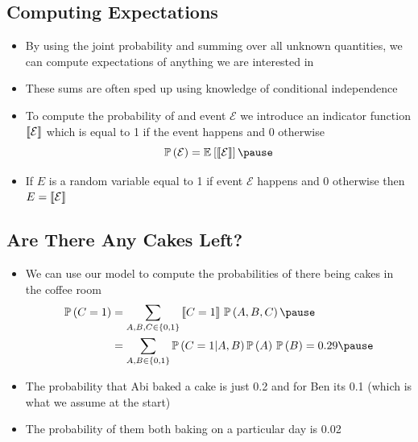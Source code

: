 
\begin{slide}
\section{Computing Expectations}

\begin{PauseHighLight}
  \begin{itemize}
  \item By using the joint probability and summing over all unknown
    quantities, we can compute expectations of anything we are
    interested in\pause
  \item These sums are often sped up using knowledge of conditional
    independence\pause
  \item To compute the probability of and event $\mathcal{E}$ we
    introduce an indicator function $\left\llbracket { \small \mathcal{E}} \right\rrbracket$ which is
    equal to 1 if the event happens and 0 otherwise
    $$ \Prob{\mathcal{E}} = \av{\pred{\mathcal{E}}} \pause $$
  \item If $E$ is a random variable equal to 1 if event $\mathcal{E}$
    happens and 0 otherwise then $E = \left\llbracket { \small \mathcal{E}} \right\rrbracket$\pause
  \end{itemize}
\end{PauseHighLight}

\end{slide}


\begin{slide}
\section{Are There Any Cakes Left?}

\begin{PauseHighLight}
  \begin{itemize}
  \item We can use our model to compute the probabilities of there
    being cakes in the coffee room
    \begin{align*}
      \Prob{C=1} &= \sum_{A,B,C\in\{0,1\}}
                   \pred{C=1}\, \Prob{A,B,C} \pause \\
      &= \sum_{A,B\in\{0,1\}}
       \Prob{C=1|A,B} \Prob{A}\,\Prob{B} = 0.29\pause
    \end{align*}
  \item The probability that Abi baked a cake is just 0.2 and for Ben
    its 0.1 (which is what we assume at the start)\pause
  \item The probability of them both baking on a particular day is 0.02\pause
  \end{itemize}
\end{PauseHighLight}

\end{slide}

